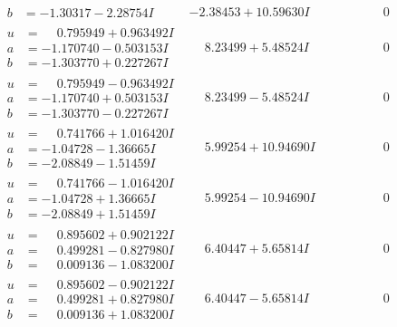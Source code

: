 \documentclass[1p]{elsarticle_modified}
\theoremstyle{definition}
\begin{document}
$$\begin{array}{c|c|c}
\begin{aligned}
b &= -1.30317 - 2.28754 I\end{aligned}
 & -2.38453 + 10.59630 I & \phantom{-0.000000 } 0 \\ \hline\begin{aligned}
u &= \phantom{-}0.795949 + 0.963492 I \\
a &= -1.170740 - 0.503153 I \\
b &= -1.303770 + 0.227267 I\end{aligned}
 & \phantom{-}8.23499 + 5.48524 I & \phantom{-0.000000 } 0 \\ \hline\begin{aligned}
u &= \phantom{-}0.795949 - 0.963492 I \\
a &= -1.170740 + 0.503153 I \\
b &= -1.303770 - 0.227267 I\end{aligned}
 & \phantom{-}8.23499 - 5.48524 I & \phantom{-0.000000 } 0 \\ \hline\begin{aligned}
u &= \phantom{-}0.741766 + 1.016420 I \\
a &= -1.04728 - 1.36665 I \\
b &= -2.08849 - 1.51459 I\end{aligned}
 & \phantom{-}5.99254 + 10.94690 I & \phantom{-0.000000 } 0 \\ \hline\begin{aligned}
u &= \phantom{-}0.741766 - 1.016420 I \\
a &= -1.04728 + 1.36665 I \\
b &= -2.08849 + 1.51459 I\end{aligned}
 & \phantom{-}5.99254 - 10.94690 I & \phantom{-0.000000 } 0 \\ \hline\begin{aligned}
u &= \phantom{-}0.895602 + 0.902122 I \\
a &= \phantom{-}0.499281 - 0.827980 I \\
b &= \phantom{-}0.009136 - 1.083200 I\end{aligned}
 & \phantom{-}6.40447 + 5.65814 I & \phantom{-0.000000 } 0 \\ \hline\begin{aligned}
u &= \phantom{-}0.895602 - 0.902122 I \\
a &= \phantom{-}0.499281 + 0.827980 I \\
b &= \phantom{-}0.009136 + 1.083200 I\end{aligned}
 & \phantom{-}6.40447 - 5.65814 I & \phantom{-0.000000 } 0 \\ \hline\begin{aligned}

\end{aligned}
\end{array}$$
\end{document}
